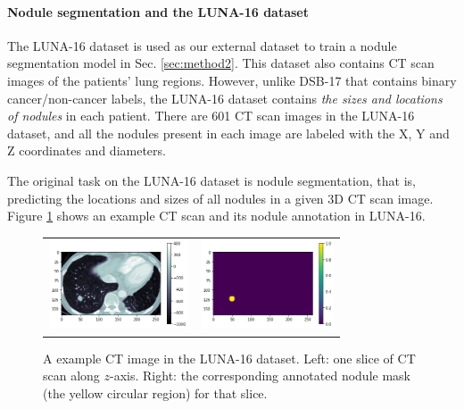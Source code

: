 \documentclass{article}
\begin{document}
\paragraph{Nodule segmentation and the LUNA-16 dataset}
The LUNA-16 dataset \cite{setio2016validation} is used as our external dataset to train a nodule segmentation model in Sec. \ref{sec:method2}. This dataset also contains CT scan images of the patients' lung regions. However, unlike DSB-17 that contains binary cancer/non-cancer labels, the LUNA-16 dataset contains \textit{the sizes and locations of nodules} in each patient. There are 601 CT scan images in the LUNA-16 dataset, and all the nodules present in each image are labeled with the X, Y and Z coordinates and diameters.

The original task on the LUNA-16 dataset is nodule segmentation, that is, predicting the locations and sizes of all nodules in a given 3D CT scan image. Figure \ref{fig:luna16_data} shows an example CT scan and its nodule annotation in LUNA-16.

\begin{figure}[t]
  \centering
  \begin{tabular}{cc}
  \includegraphics[height=100px]{figures/luna16_1.png} &
  \includegraphics[height=100px]{figures/luna16_2.png} \\
  \end{tabular}
  \caption{A example CT image in the LUNA-16 dataset. Left: one slice of CT scan along $z$-axis. Right: the corresponding annotated nodule mask (the yellow circular region) for that slice.}
  \label{fig:luna16_data}
\end{figure}
\end{document}
